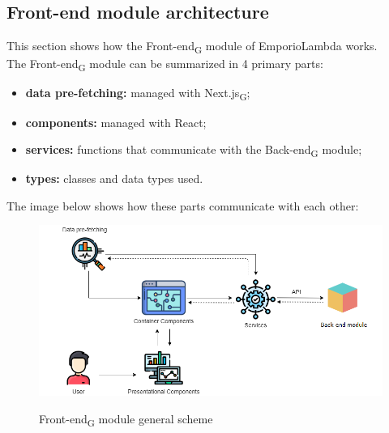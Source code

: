 \subsection{Front-end module architecture}
This section shows how the Front-end\textsubscript{G} module of EmporioLambda works. \\The Front-end\textsubscript{G} module can be summarized in 4 primary parts:
\begin{itemize}
\item \textbf{data pre-fetching:} managed with Next.js\textsubscript{G};
\item \textbf{components:} managed with React;
\item \textbf{services:} functions that communicate with the Back-end\textsubscript{G} module;
\item \textbf{types:} classes and data types used.
\end{itemize} 
The image below shows how these parts communicate with each other:
\begin{figure}[H]
\centering
\includegraphics[scale=0.58]{res/Architettura/Frontend/img/general_frontend}\\
\caption{Front-end\textsubscript{G} module general scheme}
\end{figure}


